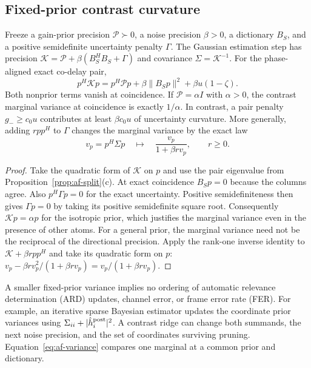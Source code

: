 \subsection{Fixed-prior contrast curvature}

\begin{afdmcor}
\label{cor:af-prior}
Freeze a gain-prior precision $\mathcal P\succ0$, a noise precision
$\beta>0$, a dictionary $B_S$, and a positive semidefinite uncertainty
penalty $\Gamma$. The Gaussian estimation step has precision
$\mathcal K=\mathcal P+\beta(B_S^HB_S+\Gamma)$ and covariance
$\Sigma=\mathcal K^{-1}$. For the phase-aligned exact co-delay pair,
\[
 p^H\mathcal Kp
  =p^H\mathcal Pp+\beta\|B_Sp\|^2+\beta u(1-\zeta).
\]
Both nonprior terms vanish at coincidence. If $\mathcal P=\alpha I$
with $\alpha>0$, the contrast marginal variance at coincidence is
exactly $1/\alpha$. In contrast, a pair penalty $g_-\ge c_0u$ contributes
at least $\beta c_0u$ of uncertainty curvature. More generally, adding
$rpp^H$ to $\Gamma$ changes the marginal variance by the exact law
\begin{equation}
 v_p=p^H\Sigma p
 \quad\longmapsto\quad
 \frac{v_p}{1+\beta r v_p},\qquad r\ge0 .                \label{eq:af-variance}
\end{equation}
\end{afdmcor}

\begin{proof}
Take the quadratic form of $\mathcal K$ on $p$ and use the pair
eigenvalue from Proposition~\ref{prop:af-split}(c).
At exact coincidence $B_Sp=0$ because the columns agree.
Also $p^H\Gamma p=0$ for the exact uncertainty. Positive semidefiniteness
then gives $\Gamma p=0$ by taking its positive semidefinite square root.
Consequently $\mathcal Kp=\alpha p$ for the isotropic prior, which
justifies the marginal variance even in the presence of other atoms.
For a general prior, the marginal variance need not be the reciprocal
of the directional precision. Apply the rank-one inverse identity to
$\mathcal K+\beta rpp^H$ and take its quadratic form on $p$:
$v_p-\beta r v_p^2/(1+\beta rv_p)=v_p/(1+\beta rv_p)$.
\end{proof}

A smaller fixed-prior variance implies no ordering of automatic relevance
determination (ARD) updates, channel error, or frame error rate (FER).
For example, an iterative sparse Bayesian estimator updates the coordinate
prior variances using $\Sigma_{ii}+|\hat h_i^{\rm post}|^2$. A contrast
ridge can change both summands, the next noise precision, and the set of
coordinates surviving pruning. Equation~\eqref{eq:af-variance} compares
one marginal at a common prior and dictionary.

